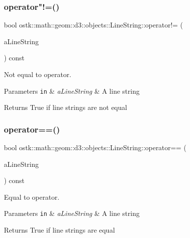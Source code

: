 \subsubsection{\texorpdfstring{operator"!=()}{operator!=()}}
{\footnotesize\ttfamily bool ostk\+::math\+::geom\+::d3\+::objects\+::\+Line\+String\+::operator!= (\begin{DoxyParamCaption}\item[{const \hyperlink{classostk_1_1math_1_1geom_1_1d3_1_1objects_1_1_line_string}{Line\+String} \&}]{a\+Line\+String }\end{DoxyParamCaption}) const}



Not equal to operator. 


\begin{DoxyParams}[1]{Parameters}
\mbox{\tt in}  & {\em a\+Line\+String} & A line string \\
\hline
\end{DoxyParams}
\begin{DoxyReturn}{Returns}
True if line strings are not equal 
\end{DoxyReturn}
\mbox{\label{classostk_1_1math_1_1geom_1_1d3_1_1objects_1_1_line_string_a5f01a20d69e144debf566d7244a24d07}} 
\subsubsection{\texorpdfstring{operator==()}{operator==()}}
{\footnotesize\ttfamily bool ostk\+::math\+::geom\+::d3\+::objects\+::\+Line\+String\+::operator== (\begin{DoxyParamCaption}\item[{const \hyperlink{classostk_1_1math_1_1geom_1_1d3_1_1objects_1_1_line_string}{Line\+String} \&}]{a\+Line\+String }\end{DoxyParamCaption}) const}



Equal to operator. 


\begin{DoxyParams}[1]{Parameters}
\mbox{\tt in}  & {\em a\+Line\+String} & A line string \\
\hline
\end{DoxyParams}
\begin{DoxyReturn}{Returns}
True if line strings are equal 
\end{DoxyReturn}
\mbox{\label{classostk_1_1math_1_1geom_1_1d3_1_1objects_1_1_line_string_a19544146cc4dc2138458c4a228e68d21}} 
